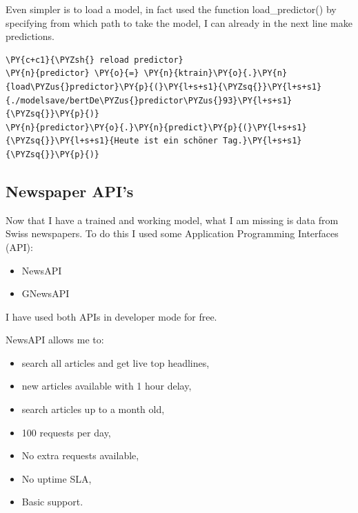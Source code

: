 Even simpler is to load a model, in fact used the function load\_predictor() by specifying from which path to take the model, I can already in the next line make predictions.
\begin{tcolorbox}[breakable, size=fbox, boxrule=1pt, pad at break*=1mm,colback=cellbackground, colframe=cellborder]
\begin{Verbatim}[commandchars=\\\{\},fontsize=\footnotesize]
\PY{c+c1}{\PYZsh{} reload predictor}
\PY{n}{predictor} \PY{o}{=} \PY{n}{ktrain}\PY{o}{.}\PY{n}{load\PYZus{}predictor}\PY{p}{(}\PY{l+s+s1}{\PYZsq{}}\PY{l+s+s1}{./modelsave/bertDe\PYZus{}predictor\PYZus{}93}\PY{l+s+s1}{\PYZsq{}}\PY{p}{)}
\PY{n}{predictor}\PY{o}{.}\PY{n}{predict}\PY{p}{(}\PY{l+s+s1}{\PYZsq{}}\PY{l+s+s1}{Heute ist ein schöner Tag.}\PY{l+s+s1}{\PYZsq{}}\PY{p}{)}
\end{Verbatim}
\end{tcolorbox}


\subsection{Newspaper API's}
\label{chap:news apis}
Now that I have a trained and working model, what I am missing is data from Swiss newspapers.
To do this I used some Application Programming Interfaces (API):
\begin{itemize}
    \item NewsAPI \cite{noauthor_news_nodate}
    \item GNewsAPI \cite{noauthor_gnews_nodate}
\end{itemize}

I have used both APIs in developer mode for free.

NewsAPI allows me to:
\begin{itemize}
    \item search all articles and get live top headlines,
    \item new articles available with 1 hour delay,
    \item search articles up to a month old,
    \item 100 requests per day,
    \item No extra requests available,
    \item No uptime SLA,
    \item Basic support.
\end{itemize}


